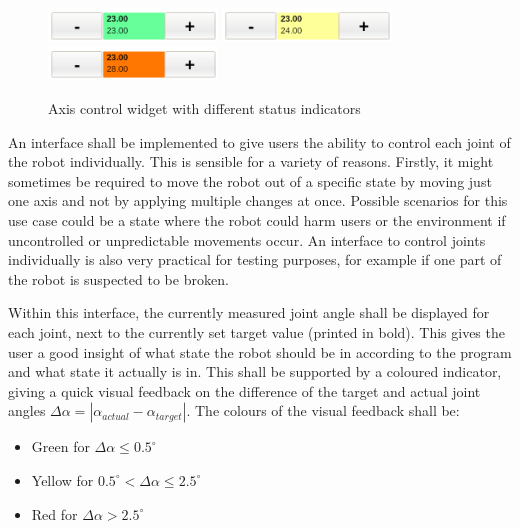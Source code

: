 \begin{figure}
	\caption{\label{fig:axiscontrol}Axis control widget with different status indicators}
	\includegraphics[width=0.4\textwidth]{assets/chpt_concepts/AxisControlGreen}
	\includegraphics[width=0.4\textwidth]{assets/chpt_concepts/AxisControlYellow}
	\includegraphics[width=0.4\textwidth]{assets/chpt_concepts/AxisControlRed}
\end{figure}

An interface shall be implemented to give users the ability to control each joint of the robot individually. This is sensible for a variety of reasons. Firstly, it might sometimes be required to move the robot out of a specific state by moving just one axis and not by applying multiple changes at once. Possible scenarios for this use case could be a state where the robot could harm users or the environment if uncontrolled or unpredictable movements occur. An interface to control joints individually is also very practical for testing purposes, for example if one part of the robot is suspected to be broken.

Within this interface, the currently measured joint angle shall be displayed for each joint, next to the currently set target value (printed in bold). This gives the user a good insight of what state the robot should be in according to the program and what state it actually is in. This shall be supported by a coloured indicator, giving a quick visual feedback on the difference of the target and actual joint angles $\Delta \alpha = |\alpha_{actual} - \alpha_{target}|$. The colours of the visual feedback shall be:

\begin{itemize}
	\item Green for $\Delta\alpha \leq 0.5^\circ$
	\item Yellow for $0.5^\circ < \Delta\alpha \leq 2.5^\circ$
	\item Red for $\Delta\alpha > 2.5^\circ$ 
\end{itemize}


